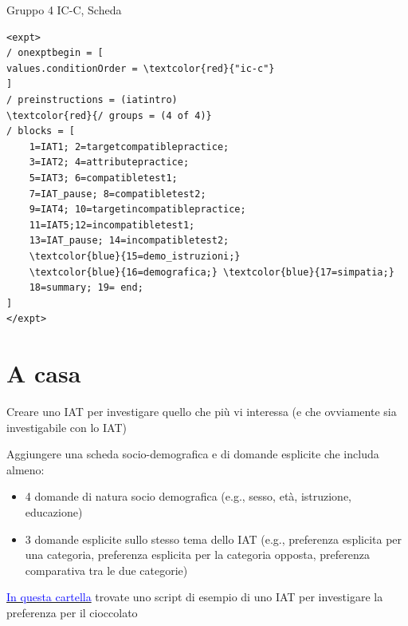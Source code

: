 \documentclass{beamer}
\begin{document}
\begin{frame}[fragile]{Gruppo 4}
 IC-C, Scheda
	\begin{footnotesize}
	\begin{Verbatim}[commandchars=\\\{\}]
<expt>
/ onexptbegin = [
values.conditionOrder = \textcolor{red}{"ic-c"}
]
/ preinstructions = (iatintro)
\textcolor{red}{/ groups = (4 of 4)}
/ blocks = [
	1=IAT1; 2=targetcompatiblepractice; 
	3=IAT2; 4=attributepractice; 
	5=IAT3; 6=compatibletest1; 
	7=IAT_pause; 8=compatibletest2; 
	9=IAT4; 10=targetincompatiblepractice; 
	11=IAT5;12=incompatibletest1; 
	13=IAT_pause; 14=incompatibletest2; 		
	\textcolor{blue}{15=demo_istruzioni;} 
	\textcolor{blue}{16=demografica;} \textcolor{blue}{17=simpatia;}
	18=summary; 19= end;
]
</expt>			
	\end{Verbatim}
\end{footnotesize}
	
\end{frame}
\section{A casa}

\begin{frame}
	Creare uno IAT per investigare quello che più vi interessa (e che ovviamente sia investigabile con lo IAT)
	
	\vspace{3mm}
	
	Aggiungere una scheda socio-demografica e di domande esplicite che includa almeno: 
	\begin{itemize}
		\item 4 domande di natura socio demografica (e.g., sesso, età, istruzione, educazione)
		\item  3 domande esplicite sullo stesso tema dello IAT (e.g., preferenza esplicita per una categoria, preferenza esplicita per la categoria opposta, preferenza comparativa tra le due categorie)
	\end{itemize}
\vspace{3mm}

 \href{https://drive.google.com/drive/folders/11J1KG9HegG8JcvxogtuJAfIhri_k7Xiy?usp=sharing}{\textcolor{blue}{In questa cartella}} trovate uno script di esempio di uno IAT per investigare la preferenza per il cioccolato 
\end{frame}
\end{document}
